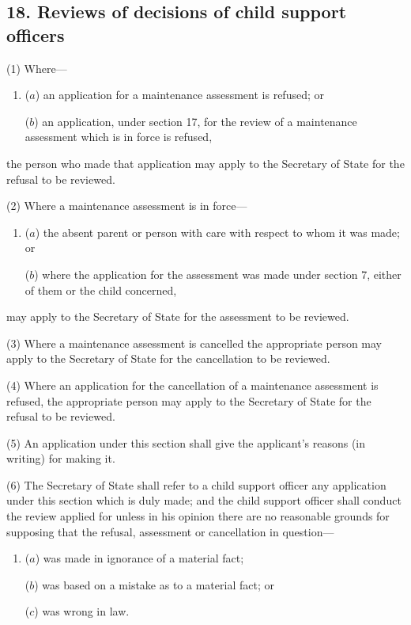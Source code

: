 \documentclass[12pt,a4paper]{article}
\begin{document}

\subsection{18. Reviews of decisions of child support officers}

(1) Where—
\begin{enumerate}\item[]
($a$) an application for a maintenance assessment is refused; or

($b$) an application, under section 17, for the review of a maintenance assessment which is in force is refused,
\end{enumerate}
the person who made that application may apply to the Secretary of State for the refusal to be reviewed.

(2) Where a maintenance assessment is in force—
\begin{enumerate}\item[]
($a$) the absent parent or person with care with respect to whom it was made; or

($b$) where the application for the assessment was made under section 7, either of them or the child concerned,
\end{enumerate}
may apply to the Secretary of State for the assessment to be reviewed.

(3) Where a maintenance assessment is cancelled the appropriate person may apply to the Secretary of State for the cancellation to be reviewed.

(4) Where an application for the cancellation of a maintenance assessment is refused, the appropriate person may apply to the Secretary of State for the refusal to be reviewed.

(5) An application under this section shall give the applicant’s reasons (in writing) for making it.

(6) The Secretary of State shall refer to a child support officer any application under this section which is duly made; and the child support officer shall conduct the review applied for unless in his opinion there are no reasonable grounds for supposing that the refusal, assessment or cancellation in question—
\begin{enumerate}\item[]
($a$) was made in ignorance of a material fact;

($b$) was based on a mistake as to a material fact;
or  %

($c$) was wrong in law.
\end{enumerate}
\end{document}
